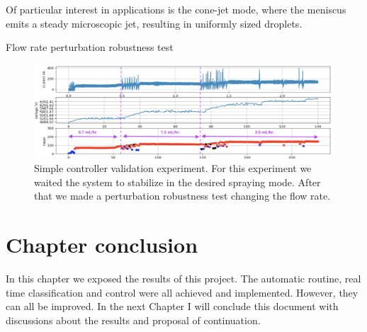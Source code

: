     Of particular interest in applications is the cone-jet mode, where the meniscus emits a steady microscopic jet, resulting in uniformly sized droplets. 

        Flow rate perturbation robustness test

        \begin{figure}[H]
            \center
            \includegraphics[width=17cm]{Figuras/19:03/control_first_results.png}
            \caption{Simple controller validation experiment. For this experiment we waited the system to stabilize in the desired spraying mode. After that we made a perturbation robustness test changing the flow rate.}
            \label{fig:control_results}
        \end{figure}


\section{Chapter conclusion}

In this chapter we exposed the results of this project. The automatic routine, real time classification and control were all achieved and implemented. However, they can all be improved. In the next Chapter I will conclude this document with discussions about the results and proposal of continuation.


\clearpage